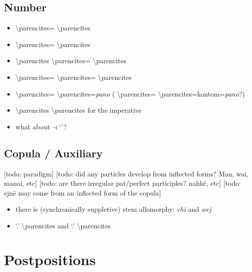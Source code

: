 \documentclass{memoir}
\begin{document}
\section{\texorpdfstring{Number \label{sec:verbalnumber}}{Number }}

\begin{itemize}
\tightlist
\item
   \textbackslash parencites=
  \textbackslash parencites
\item
   \textbackslash parencites=
  \textbackslash parencites
\item
   \textbackslash parencites
  \textbackslash parencites= \textbackslash parencites
\item
   \textbackslash parencites=
  \textbackslash parencites= \textbackslash parencites
\item
   \textbackslash parencites=
  \textbackslash parencites=\emph{pano} (
  \textbackslash parencites=
  \textbackslash parencites=kontom=\emph{pano}?)
\item
   \textbackslash parencites \textbackslash parencites
  for the imperative
\item
  what about \emph{-i} `'?
\end{itemize}

\section{Copula / Auxiliary}

{[}todo: paradigm{]} {[}todo: did any particles develop from inflected
forms? Man, wai, manai, etc{]} {[}todo: are there irregular pat/perfect
participles? nahkë, etc{]} {[}todo: ejnë may come from an inflected form
of the copula{]}

\begin{itemize}
\tightlist
\item
  there is (synchronically suppletive) stem allomorphy: \emph{chi} and
  \emph{wej}
\item
   `.' \textbackslash parencites and
   `.' \textbackslash parencites
\end{itemize}

\chapter{\texorpdfstring{Postpositions \label{postp}}{Postpositions }}
\end{document}
